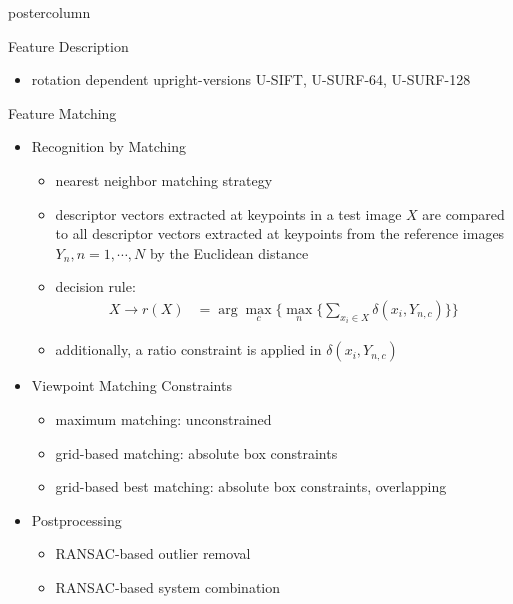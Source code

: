 \documentclass[final,hyperref={pdfpagelabels=false}]{beamer}
\begin{document}
\begin{frame}
\begin{columns}
\begin{column}{.49\textwidth}
\begin{beamercolorbox}[center,wd=\textwidth]{postercolumn}
\begin{minipage}[T]{.95\textwidth}
{\begin{block}{Feature Description}
\begin{itemize}
                \begin{itemize}
                \item rotation dependent upright-versions U-SIFT, U-SURF-64, U-SURF-128
                \end{itemize}
              \end{itemize}
            \end{block}
            \vfill
            \begin{block}{Feature Matching}
              \begin{itemize}
              \item Recognition by Matching
                \begin{itemize}
                \item nearest neighbor matching strategy
                \item descriptor vectors extracted at keypoints in a test image $X$ are compared to all descriptor vectors extracted at keypoints from the reference images $Y_n, n=1,\cdots,N$ by the Euclidean distance
                \item decision rule:
                  \begin{align*}
                    X \rightarrow r(X) & = \arg \max_{c} \Big\{ \max_n \big\{ \sum_{x_i \in X} \delta(x_i,Y_{n,c})\big\} \Big\}
                  \end{align*}
                \item additionally, a ratio constraint is applied in $\delta(x_i,Y_{n,c})$
                \end{itemize}
              \item Viewpoint Matching Constraints
                \begin{itemize}
                \item maximum matching: unconstrained
                \item grid-based matching: absolute box constraints
                \item grid-based best matching: absolute box constraints, overlapping
                \end{itemize}
              \item Postprocessing
                \begin{itemize}
                \item RANSAC-based outlier removal
                \item RANSAC-based system combination
                \end{itemize}
              \end{itemize}

\end{block}}
\end{minipage}
\end{beamercolorbox}
\end{column}
\end{columns}
\end{frame}
\end{document}
